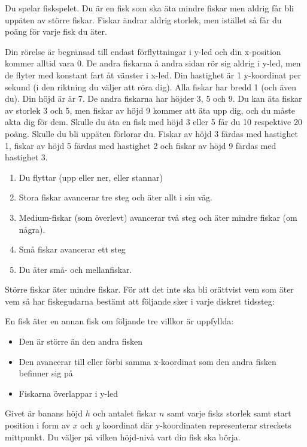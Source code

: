 
Du spelar fiskspelet. Du är en fisk som ska äta mindre fiskar men aldrig får
bli uppäten av större fiskar. Fiskar ändrar aldrig storlek, men istället så får
du poäng för varje fisk du äter.

Din rörelse är begränsad till endast förflyttningar i y-led och din x-position
kommer alltid vara 0. De andra fiskarna å andra sidan rör sig aldrig i y-led,
men de flyter med konstant fart åt vänster i x-led. Din hastighet är 1
y-koordinat per sekund (i den riktning du väljer att röra dig). Alla fiskar har bredd 1 (och även du). Din höjd är är 7. De andra fiskarna har höjder 3, 5 och 9. Du kan äta fiskar av storlek 3 och 5, men fiskar av höjd 9 kommer att äta upp dig, och du måste akta dig för dem. Skulle du äta en fisk med höjd 3 eller 5 får du 10 respektive
20 poäng. Skulle du bli uppäten förlorar du. Fiskar av höjd 3 färdas med hastighet 1, fiskar av höjd 5 färdas med hastighet 2 och fiskar av höjd 9 färdas med hastighet 3.

\begin{enumerate}
  \item
     Du flyttar (upp eller ner, eller stannar)
  \item
     Stora fiskar avancerar tre steg och äter allt i sin väg.
  \item
     Medium-fiskar (som överlevt) avancerar två steg och äter mindre fiskar (om några).
  \item
     Små fiskar avancerar ett steg
  \item
     Du äter små- och mellanfiskar.
\end{enumerate}

Större fiskar äter mindre fiskar. För att det inte ska bli orättvist vem som äter vem så har fiskegudarna bestämt att följande sker i varje diskret tidssteg:

En fisk äter en annan fisk om följande tre villkor är uppfyllda:

\begin{itemize}
  \item
    Den är större än den andra fisken 
  \item
    Den avancerar till eller förbi samma x-koordinat som den andra fisken befinner sig på 
  \item
    Fiskarna överlappar i y-led
\end{itemize}

Givet är banans höjd $h$ och antalet fiskar $n$ samt
varje fisks storlek samt start position i form av $x$ och $y$ koordinat där y-koordinaten 
representerar streckets mittpunkt. Du väljer på vilken höjd-nivå vart din fisk ska börja.

